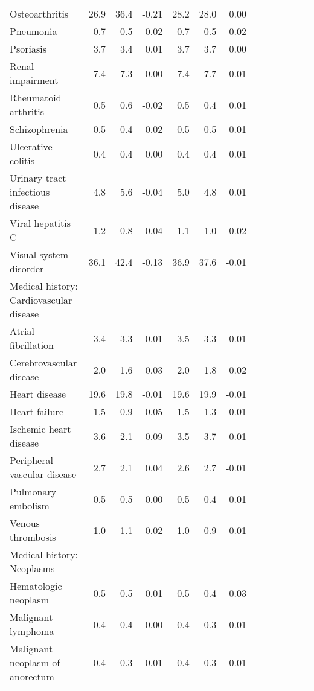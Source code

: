 \documentclass[11pt,]{article}
\begin{document}
\begin{longtable}{lrrrrrrrrrrrr}
      Osteoarthritis & 26.9 & 36.4 & -0.21 & 28.2 &  28.0 &  0.00 \\ 
      Pneumonia &  0.7 &  0.5 &  0.02 &  0.7 &   0.5 &  0.02 \\ 
      Psoriasis &  3.7 &  3.4 &  0.01 &  3.7 &   3.7 &  0.00 \\ 
      Renal impairment &  7.4 &  7.3 &  0.00 &  7.4 &   7.7 & -0.01 \\ 
      Rheumatoid arthritis &  0.5 &  0.6 & -0.02 &  0.5 &   0.4 &  0.01 \\ 
      Schizophrenia &  0.5 &  0.4 &  0.02 &  0.5 &   0.5 &  0.01 \\ 
      Ulcerative colitis &  0.4 &  0.4 &  0.00 &  0.4 &   0.4 &  0.01 \\ 
      Urinary tract infectious disease &  4.8 &  5.6 & -0.04 &  5.0 &   4.8 &  0.01 \\ 
      Viral hepatitis C &  1.2 &  0.8 &  0.04 &  1.1 &   1.0 &  0.02 \\ 
      Visual system disorder & 36.1 & 42.4 & -0.13 & 36.9 &  37.6 & -0.01 \\ 
  Medical history: Cardiovascular disease &    &    &     &    &     &     \\ 
      Atrial fibrillation &  3.4 &  3.3 &  0.01 &  3.5 &   3.3 &  0.01 \\ 
      Cerebrovascular disease &  2.0 &  1.6 &  0.03 &  2.0 &   1.8 &  0.02 \\ 
      Heart disease & 19.6 & 19.8 & -0.01 & 19.6 &  19.9 & -0.01 \\ 
      Heart failure &  1.5 &  0.9 &  0.05 &  1.5 &   1.3 &  0.01 \\ 
      Ischemic heart disease &  3.6 &  2.1 &  0.09 &  3.5 &   3.7 & -0.01 \\ 
      Peripheral vascular disease &  2.7 &  2.1 &  0.04 &  2.6 &   2.7 & -0.01 \\ 
      Pulmonary embolism &  0.5 &  0.5 &  0.00 &  0.5 &   0.4 &  0.01 \\ 
      Venous thrombosis &  1.0 &  1.1 & -0.02 &  1.0 &   0.9 &  0.01 \\ 
  Medical history: Neoplasms &    &    &     &    &     &     \\ 
      Hematologic neoplasm &  0.5 &  0.5 &  0.01 &  0.5 &   0.4 &  0.03 \\ 
      Malignant lymphoma &  0.4 &  0.4 &  0.00 &  0.4 &   0.3 &  0.01 \\ 
      Malignant neoplasm of anorectum &  0.4 &  0.3 &  0.01 &  0.4 &   0.3 &  0.01 \\ 

\end{longtable}
\end{document}
